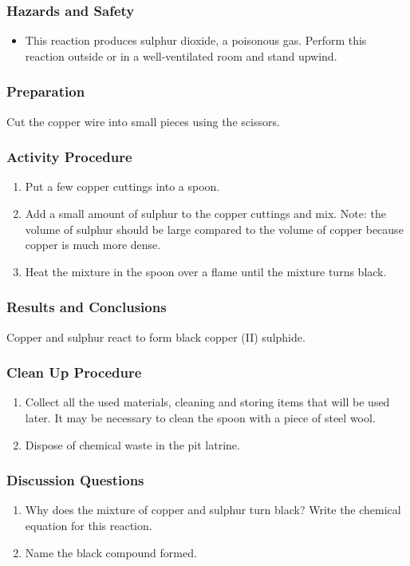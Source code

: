 \subsubsection*{Hazards and Safety}
\begin{itemize}
\item{This reaction produces sulphur dioxide, a poisonous gas. Perform this reaction outside or in a well-ventilated room and stand upwind.}
\end{itemize}

\subsubsection*{Preparation}
Cut the copper wire into small pieces using the scissors.

\subsubsection*{Activity Procedure}
\begin{enumerate}
\item{Put a few copper cuttings into a spoon.}
\item{Add a small amount of sulphur to the copper cuttings and mix. Note: the volume of sulphur should be large compared to the volume of copper because copper is much more dense.}
\item{Heat the mixture in the spoon over a flame until the mixture turns black.}
\end{enumerate}

\subsubsection*{Results and Conclusions}
Copper and sulphur react to form black copper (II) sulphide.

\subsubsection*{Clean Up Procedure}
\begin{enumerate}
\item{Collect all the used materials, cleaning and storing items that will be used later. It may be necessary to clean the spoon with a piece of steel wool.}
\item{Dispose of chemical waste in the pit latrine.}
\end{enumerate}

\subsubsection*{Discussion Questions}
\begin{enumerate}
\item{Why does the mixture of copper and sulphur turn black? Write the chemical equation for this reaction.}
\item{Name the black compound formed.}
\end{enumerate}
